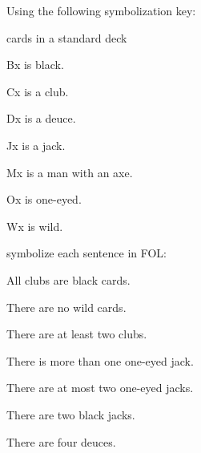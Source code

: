 \solutions
\problempart
\label{pr.FOLcards}
Using the following symbolization key:
\begin{ekey}
\item[\text{domain}] cards in a standard deck
\item[Bx]  is black.
\item[Cx]  is a club.
\item[Dx]  is a deuce.
\item[Jx]  is a jack.
\item[Mx]  is a man with an axe.
\item[Ox]  is one-eyed.
\item[Wx]  is wild.
\end{ekey}
symbolize each sentence in FOL:
\begin{earg}
\item All clubs are black cards.
\item[] 
\item There are no wild cards.
\item[] 
\item There are at least two clubs.
\item[] 
\item There is more than one one-eyed jack.
\item[] 
\item There are at most two one-eyed jacks.
\item[] 
\item There are two black jacks.
\item[] 
\item There are four deuces.
\item[] 
\end{earg}
